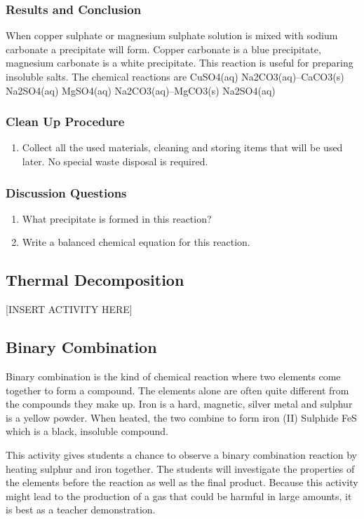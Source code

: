 \subsubsection*{Results and Conclusion}
When copper sulphate or magnesium sulphate solution is mixed with sodium carbonate a precipitate will form. Copper carbonate is a blue precipitate, magnesium carbonate is a white precipitate. This reaction is useful for preparing insoluble salts.
The chemical reactions are 
CuSO4(aq) Na2CO3(aq)--CaCO3(s) Na2SO4(aq)
MgSO4(aq) Na2CO3(aq)--MgCO3(s) Na2SO4(aq)

\subsubsection*{Clean Up Procedure}
\begin{enumerate}
\item{Collect all the used materials, cleaning and storing items that will be used later. No special waste disposal is required.}
\end{enumerate}

\subsubsection*{Discussion Questions}
\begin{enumerate}
\item{What precipitate is formed in this reaction?}
\item{Write a balanced chemical equation for this reaction.}
\end{enumerate}

\subsection{Thermal Decomposition}

[INSERT ACTIVITY HERE]

\subsection{Binary Combination}
Binary combination is the kind of chemical reaction where two elements come together to form a compound. The elements alone are often quite different from the compounds they make up. Iron is a hard, magnetic, silver metal and sulphur is a yellow powder. When heated, the two combine to form iron (II) Sulphide FeS which is a black, insoluble compound. 

This activity gives students a chance to observe a binary combination reaction by heating sulphur and iron together. The students will investigate the properties of the elements before the reaction as well as the final product. Because this activity might lead to the production of a gas that could be harmful in large amounts, it is best as a teacher demonstration.

